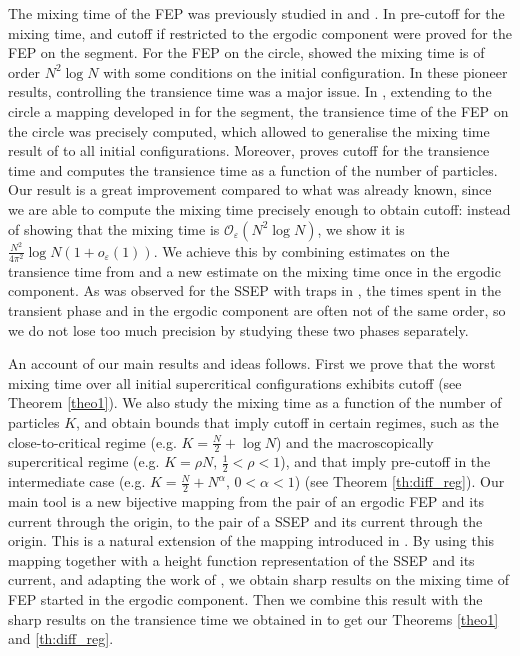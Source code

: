 \documentclass[11pt,a4paper]{article}
\begin{document}
The mixing time of the FEP was previously studied in  \cite{ayre_mixing_2024}  and \cite{erignoux_cutoff_2024}. In \cite{ayre_mixing_2024}  pre-cutoff for the mixing time, and cutoff if restricted to the ergodic component were proved for the FEP on the segment.
For the FEP on the circle,  \cite{ayre_mixing_2024} showed the mixing time is of order $N^2\log N$ with some conditions on the initial configuration. 
In these pioneer results, controlling the transience time was a major issue. In \cite{erignoux_cutoff_2024}, extending to the circle a mapping developed in \cite{ayre_mixing_2024} for the segment, the transience time of the FEP on the circle was precisely computed, which allowed to generalise the mixing time result of \cite{ayre_mixing_2024} to all initial configurations. 
Moreover, \cite{erignoux_cutoff_2024} proves cutoff for the transience time and computes the transience time as a function of the number of particles. 
Our result is a great improvement compared to  what was already known, since we are able to compute the mixing time precisely enough to obtain cutoff: instead of showing that the mixing time is $\mathcal{O}_\varepsilon(N^2\log N)$, we show it is $\frac{N^2}{4\pi^2}\log N (1+o_\varepsilon(1))$. We achieve this by combining estimates on the transience time from \cite{erignoux_cutoff_2024} and a new estimate on the mixing time once in the ergodic component. As was observed for the SSEP with traps in \cite{erignoux_cutoff_2024}, the times spent in the transient phase and in the ergodic component are often not of the same order, so we do not lose too much precision by studying these two phases separately. 
 
An account of our main results and ideas follows. First we prove that the worst mixing time over all initial supercritical configurations exhibits cutoff (see Theorem \ref{theo1}). We also study the mixing time as a function of the number of particles $K$, and obtain bounds that imply cutoff in certain regimes, such as the close-to-critical regime (e.g. $K=\frac{N}{2} + \log N$) and the macroscopically supercritical regime (e.g. $K = \rho N, \, \frac12<\rho<1$), and that imply pre-cutoff in the intermediate case (e.g. $K=\frac{N}{2} + N^\alpha, \,0<\alpha<1$) (see Theorem \ref{th:diff_reg}). Our main tool is a new bijective mapping from the pair of an ergodic FEP and its current through the origin, to the pair of a SSEP and its current through the origin. This is a natural extension of the mapping introduced in \cite{erignoux_cutoff_2024}. By using this mapping together with a height function representation of the SSEP and its current, and adapting the work of \cite{lacoin_simple_2017}, we obtain sharp results on the mixing time of FEP started in the ergodic component. Then we combine this result with the sharp results on the transience time we obtained in \cite{erignoux_cutoff_2024} to get our Theorems \ref{theo1} and \ref{th:diff_reg}.
 
\end{document}
